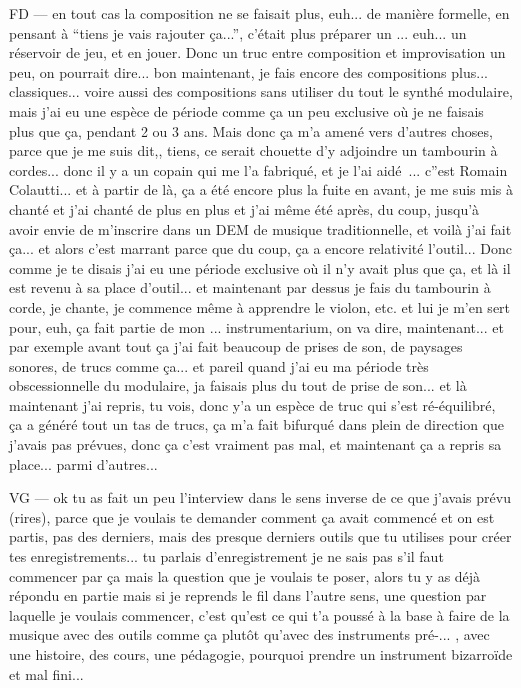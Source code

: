 FD — en tout cas la composition ne se faisait plus, euh... de manière formelle, en pensant à ``tiens je vais rajouter ça...'', c'était plus préparer un ... euh... un réservoir de jeu, et en jouer. Donc un truc entre composition et improvisation un peu, on pourrait dire... bon maintenant, je fais encore des compositions plus... classiques... voire aussi des compositions sans utiliser du tout le synthé modulaire, mais j'ai eu une espèce de période comme ça un peu exclusive où je ne faisais plus que ça, pendant 2 ou 3 ans. Mais donc ça m'a amené vers d'autres choses, parce que je me suis dit,, tiens, ce serait chouette d'y adjoindre un tambourin à cordes... donc il y a un copain qui me l'a fabriqué, et je l'ai aidé ... c''est Romain Colautti... et à partir de là, ça a été encore plus la fuite en avant, je me suis mis à chanté et j'ai chanté de plus en plus et j'ai même été après, du coup, jusqu'à avoir envie de m'inscrire dans un DEM de musique traditionnelle, et voilà j'ai fait ça... et alors c'est marrant parce que du coup, ça a encore relativité l'outil... Donc comme je te disais j'ai eu une période exclusive où il n'y avait plus que ça, et là il est revenu à sa place d'outil... et maintenant par dessus je fais du tambourin à corde, je chante, je commence même à apprendre le violon, etc. et lui je m'en sert pour, euh, ça fait partie de mon ... instrumentarium, on va dire, maintenant... et par exemple avant tout ça j'ai fait beaucoup de prises de son, de paysages sonores, de trucs comme ça... et pareil quand j'ai eu ma période très obscessionnelle du modulaire, ja faisais plus du tout de prise de son... et là maintenant j'ai repris, tu vois, donc y'a un espèce de truc qui s'est ré-équilibré, ça a généré tout un tas de trucs, ça m'a fait bifurqué dans plein de direction que j'avais pas prévues, donc ça c'est vraiment pas mal, et maintenant ça a repris sa place... parmi d'autres... 

VG — ok tu as fait un peu l'interview dans le sens inverse de ce que j'avais prévu (rires), parce que je voulais te demander comment ça avait commencé et on est partis, pas des derniers, mais des presque derniers outils que tu utilises pour créer tes enregistrements... tu parlais d'enregistrement je ne sais pas s'il faut commencer par ça mais la question que je voulais te poser, alors tu y as déjà répondu en partie mais si je reprends le fil dans l'autre sens, une question par laquelle je voulais commencer, c'est qu'est ce qui t'a poussé à la base à faire de la musique avec des outils comme ça plutôt qu'avec des instruments pré-... , avec une histoire, des cours, une pédagogie, pourquoi prendre un instrument bizarroïde et mal fini... 


